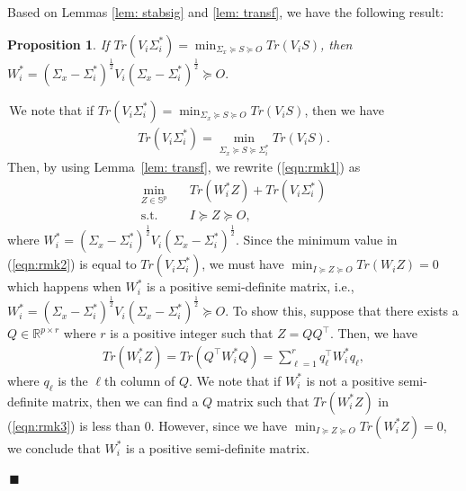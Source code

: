 \documentclass[12pt,journal,onecolumn]{IEEEtran}
\newtheorem{remark}{Remark}
\newtheorem{prop}{{Proposition}}
\newenvironment{Proof}[1]{\medskip\par\noindent{\bf Proof:\,}\,#1}{{\mbox{\,$\blacksquare$}\par}}
\begin{document}
Based on Lemmas \ref{lem: stabsig} and \ref{lem: transf}, we have the following result:
\begin{prop}\label{rem: wpsd} If
$Tr(V_i\Sigma^*_i)\!=\!\min_{\Sigma_x\succeq S\succeq O} Tr(V_i S)$, then $W_i^*\!=\!(\Sigma_x-\Sigma_i^*)^{\frac{1}{2}}V_i(\Sigma_x-\Sigma_i^*)^{\frac{1}{2}}\!\succeq\! O.$ 
\end{prop}
\begin{Proof}
We note that if $Tr(V_i\Sigma^*_i)=\min_{\Sigma_x\succeq S\succeq O} Tr(V_i S)$, then we have 
\begin{align} \label{eqn:rmk1}
    Tr(V_i\Sigma^*_i)=\min_{\Sigma_x\succeq S\succeq \Sigma^*_i} Tr(V_i S).
\end{align}
Then, by using Lemma~\ref{lem: transf}, we rewrite (\ref{eqn:rmk1}) as 
\begin{align}\label{eqn:rmk2}
\min_{Z\in\mathbb{S}^p} & \quad Tr(W_i^*Z)+ Tr(V_i\Sigma^*_i) \nonumber\\
\textrm{s.t.} & \quad 
I\succeq Z\succeq O,
\end{align}
where $W_i^*=(\Sigma_x-\Sigma_i^*)^{\frac{1}{2}}V_i(\Sigma_x-\Sigma_i^*)^{\frac{1}{2}}$. Since the minimum value in (\ref{eqn:rmk2}) is equal to $Tr(V_i\Sigma^*_i)$, we must have $\min_{I\succeq Z\succeq O} Tr(W_iZ) = 0$ which happens when $W_i^*$ is a positive semi-definite matrix, i.e., $W_i^*=(\Sigma_x-\Sigma_i^*)^{\frac{1}{2}}V_i(\Sigma_x-\Sigma_i^*)^{\frac{1}{2}}\succeq O$. To show this, suppose that there exists a $Q \in \mathbb{R}^{p\times r}$ where $r$ is a positive integer such that $Z =QQ^\top$. Then, we have 
\begin{align}\label{eqn:rmk3}
    Tr(W_i^*Z) = Tr(Q^\top W_i^*Q) = \sum_{\ell =1}^{r} q_\ell^\top W_i^*q_\ell, 
\end{align}
where $q_\ell$ is the $\ell$th column of $Q$. We note that if $W_i^*$ is not a positive semi-definite matrix, then we can find a $Q$ matrix such that $ Tr(W_i^*Z)$ in (\ref{eqn:rmk3}) is less than $0$. However, since we have $\min_{I\succeq Z\succeq O} Tr(W_i^*Z) = 0$, we conclude that $W_i^*$ is a positive semi-definite matrix.
\end{Proof}
\end{document}
